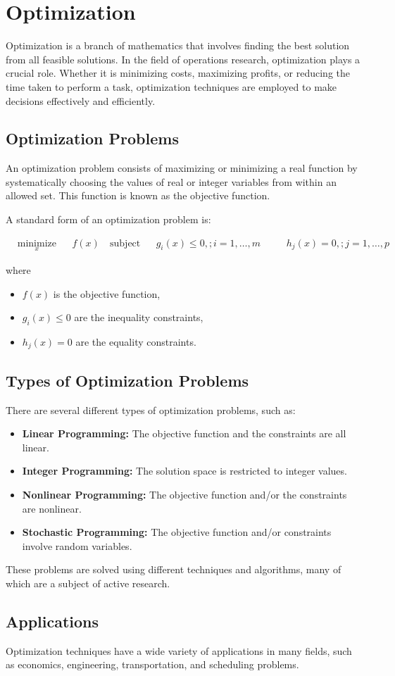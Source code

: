 \chapter{Optimization}

Optimization is a branch of mathematics that involves finding the best
solution from all feasible solutions. In the field of operations
research, optimization plays a crucial role. Whether it is minimizing
costs, maximizing profits, or reducing the time taken to perform a
task, optimization techniques are employed to make decisions
effectively and efficiently.

\section{Optimization Problems}

An optimization problem consists of maximizing or minimizing a real
function by systematically choosing the values of real or integer
variables from within an allowed set. This function is known as the
objective function.

A standard form of an optimization problem is:

\begin{equation*}
\begin{aligned}
& \underset{x}{\text{minimize}}
& & f(x) \
& \text{subject to}
& & g_i(x) \leq 0, ; i = 1, \ldots, m \
&
& & h_j(x) = 0, ; j = 1, \ldots, p
\end{aligned}
\end{equation*}

where
\begin{itemize}
\item $f(x)$ is the objective function,
\item $g_i(x) \leq 0$ are the inequality constraints,
\item $h_j(x) = 0$ are the equality constraints.
\end{itemize}

\section{Types of Optimization Problems}
There are several different types of optimization problems, such as:

\begin{itemize}
\item \textbf{Linear Programming:} The objective function and the constraints are all linear.
\item \textbf{Integer Programming:} The solution space is restricted to integer values.
\item \textbf{Nonlinear Programming:} The objective function and/or the constraints are nonlinear.
\item \textbf{Stochastic Programming:} The objective function and/or constraints involve random variables.
\end{itemize}

These problems are solved using different techniques and algorithms,
many of which are a subject of active research.

\section{Applications}

Optimization techniques have a wide variety of applications in many
fields, such as economics, engineering, transportation, and scheduling
problems.

